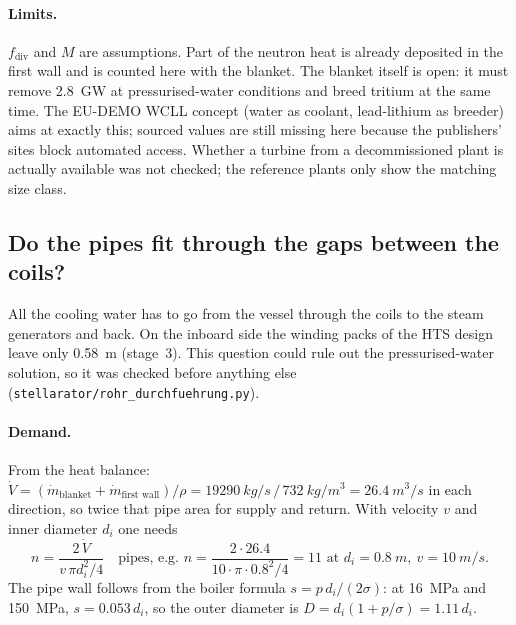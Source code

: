 \documentclass[10pt,a4paper]{article}
\begin{document}
\paragraph{Limits.} $f_\text{div}$ and $M$ are assumptions. Part of the neutron heat is already deposited in the
first wall and is counted here with the blanket. The blanket itself is open: it must remove \SI{2.8}{GW} at
pressurised-water conditions and breed tritium at the same time. The EU-DEMO WCLL concept (water as coolant,
lead-lithium as breeder) aims at exactly this; sourced values are still missing here because the publishers'
sites block automated access. Whether a turbine from a decommissioned plant is actually available was not
checked; the reference plants only show the matching size class.



\subsection{Do the pipes fit through the gaps between the coils?}
All the cooling water has to go from the vessel through the coils to the steam generators and back. On the
inboard side the winding packs of the HTS design leave only \SI{0.58}{m} (stage~3). This question could rule out
the pressurised-water solution, so it was checked before anything else (\texttt{stellarator/rohr\_durchfuehrung.py}).

\paragraph{Demand.} From the heat balance: $\dot V = (\dot m_\text{blanket} + \dot m_\text{first wall})/\rho =
\SI{19290}{kg/s}\,/\,\SI{732}{kg/m^3} = \SI{26.4}{m^3/s}$ in each direction, so twice that pipe area for supply
and return. With velocity $v$ and inner diameter $d_i$ one needs
\[ n = \frac{2\,\dot V}{v\,\pi d_i^2/4}\quad\text{pipes, e.g. } n = \frac{2\cdot 26.4}{10\cdot\pi\cdot 0.8^2/4} = 11
   \text{ at } d_i = \SI{0.8}{m},\ v = \SI{10}{m/s}. \]
The pipe wall follows from the boiler formula $s = p\,d_i/(2\sigma)$: at \SI{16}{MPa} and \SI{150}{MPa},
$s = 0.053\,d_i$, so the outer diameter is $D = d_i(1 + p/\sigma) = 1.11\,d_i$.
\end{document}
